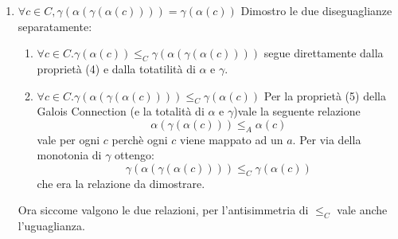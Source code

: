 {\begin{enumerate}
	
	\item $\boxed{\forall c \in C, \gamma(\alpha(\gamma(\alpha(c)))) = \gamma(\alpha(c))}$
	Dimostro le due diseguaglianze separatamente:
	\begin{enumerate}
		\item $\boxed{\forall c \in C .  \gamma(\alpha(c)) \leq_C \gamma(\alpha(\gamma(\alpha(c))))}$
		segue direttamente dalla proprietà (4) e dalla totatilità di $\alpha$ e $\gamma$.
		\item $\boxed{\forall c \in C . \gamma(\alpha(\gamma(\alpha(c)))) \leq_C \gamma(\alpha(c))}$
		Per la proprietà (5) della Galois Connection (e la totalità di $\alpha$ e $\gamma$)vale la seguente relazione
		$$
		\alpha(\gamma(\alpha(c))) \leq_A \alpha(c) 
		$$
		vale per ogni $c$ perchè ogni $c$ viene mappato ad un $a$.
		Per via della monotonia di $\gamma$ ottengo:
		$$
		\gamma(\alpha(\gamma(\alpha(c)))) \leq_C \gamma(\alpha(c))
		$$
		che era la relazione da dimostrare.
	\end{enumerate}
	Ora siccome valgono le due relazioni, per l'antisimmetria di $\leq_C$ vale anche l'uguaglianza.
\end{enumerate}
	
}